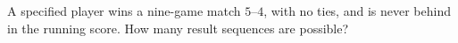 A specified player wins a nine-game match $5$--$4$, with no ties, and is never behind in the running score. How many result sequences are possible?

